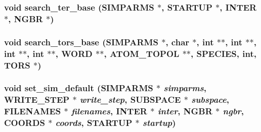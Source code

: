 \subsubsection{\setlength{\rightskip}{0pt plus 5cm}void search\_\-ter\_\-base ({\bf SIMPARMS} $\ast$, {\bf STARTUP} $\ast$, {\bf INTER} $\ast$, {\bf NGBR} $\ast$)}\label{input_2proto__input_8h_d882d007e14b62ea6901e9364f56dbb5}


\subsubsection{\setlength{\rightskip}{0pt plus 5cm}void search\_\-tors\_\-base ({\bf SIMPARMS} $\ast$, char $\ast$, int $\ast$$\ast$, int $\ast$$\ast$, int $\ast$$\ast$, int $\ast$$\ast$, {\bf WORD} $\ast$$\ast$, {\bf ATOM\_\-TOPOL} $\ast$$\ast$, {\bf SPECIES}, int, {\bf TORS} $\ast$)}\label{input_2proto__input_8h_fe74b6c6f05f1970facefff17a412f48}


\subsubsection{\setlength{\rightskip}{0pt plus 5cm}void set\_\-sim\_\-default ({\bf SIMPARMS} $\ast$ {\em simparms}, {\bf WRITE\_\-STEP} $\ast$ {\em write\_\-step}, {\bf SUBSPACE} $\ast$ {\em subspace}, {\bf FILENAMES} $\ast$ {\em filenames}, {\bf INTER} $\ast$ {\em inter}, {\bf NGBR} $\ast$ {\em ngbr}, {\bf COORDS} $\ast$ {\em coords}, {\bf STARTUP} $\ast$ {\em startup})}\label{input_2proto__input_8h_d777c0223db2b66ed56581a0dccb8723}


